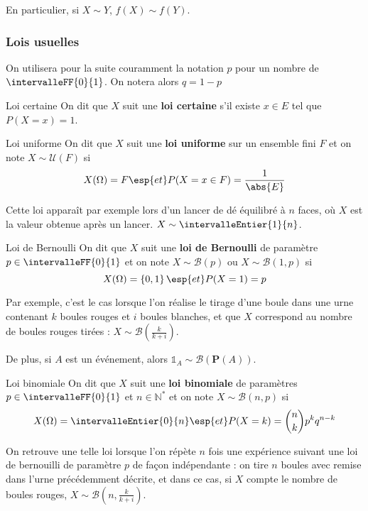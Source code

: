    En particulier, si $X \sim Y$, $f(X) \sim f(Y)$.

    \subsubsection{Lois usuelles}

    On utilisera pour la suite couramment la notation $p$ pour un nombre de $\intervalleFF{0}{1}$. On notera alors $q = 1 - p$

    \begin{defi}{Loi certaine}{}
        On dit que $X$ suit une \textbf{loi certaine} s’il existe $x \in E$ tel que $P(X = x) = 1$.
    \end{defi}

    \begin{defi}{Loi uniforme}{}
        On dit que $X$ suit une \textbf{loi uniforme} sur un ensemble fini $F$ et on note $X \sim \mathcal{U}(F)$ si 
        \[ X(\Omega) = F \esp{et} P(X = x \in F) = \frac{1}{\abs{E}} \]     
    \end{defi}

    Cette loi apparaît par exemple lors d’un lancer de dé équilibré à $n$ faces, où $X$ est la valeur obtenue après un lancer. $X \sim \intervalleEntier{1}{n}$.

    \begin{defi}{Loi de Bernoulli}{}
        On dit que $X$ suit une \textbf{loi de Bernoulli} de paramètre $p \in \intervalleFF{0}{1}$ et on note $X \sim \mathcal{B}(p)$ ou $X \sim \mathcal{B}(1,p)$ si 
        \[ X(\Omega) = \left\{0,1\right\} \esp{et} P(X = 1) = p \]   
    \end{defi}

    Par exemple, c’est le cas lorsque l’on réalise le tirage d’une boule dans une urne contenant $k$ boules rouges et $i$ boules blanches, et que $X$ correspond au nombre de boules rouges tirées : $X \sim \mathcal{B}(\frac{k}{k + i})$. 

    De plus, si $A$ est un événement, alors $\mathbb{1}_A \sim \mathcal{B}(\mathbf{P}(A))$.

    \begin{defi}{Loi binomiale}{}
        On dit que $X$ suit une \textbf{loi binomiale} de paramètres $p \in \intervalleFF{0}{1}$ et $n \in \mathbb{N}^*$ et on note $X \sim \mathcal{B}(n,p)$ si 
        \[ X(\Omega) = \intervalleEntier{0}{n} \esp{et} P(X = k) = \binom{n}{k}p^k q^{n-k} \]   
    \end{defi}

    On retrouve une telle loi lorsque l’on répète $n$ fois une expérience suivant une loi de bernouilli de paramètre $p$ de façon indépendante : on tire $n$ boules avec remise dans l’urne précédemment décrite, et dans ce cas, si $X$ compte le nombre de boules rouges, $X \sim \mathcal{B}(n, \frac{k}{k + i})$.

